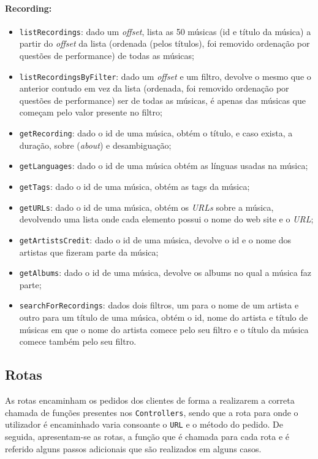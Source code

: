 \documentclass{article}
\begin{document}
\paragraph{\textbf{Recording:}}
    \begin{itemize}
        \item \texttt{listRecordings}: dado um \textit{offset}, lista as 50 músicas (id e título da música) a partir do \textit{offset} da lista (ordenada (pelos títulos), foi removido ordenação por questões de performance) de todas as músicas;
        \item \texttt{listRecordingsByFilter}: dado um \textit{offset} e um filtro, devolve o mesmo que o anterior contudo em vez da lista (ordenada, foi removido ordenação por questões de performance) ser de todas as músicas, é apenas das músicas que começam pelo valor presente no filtro;
        \item \texttt{getRecording}: dado o id de uma música, obtém o título, e caso exista, a duração, sobre (\textit{about}) e desambiguação;
        \item \texttt{getLanguages}: dado o id de uma música obtém as línguas usadas na música;
        \item \texttt{getTags}: dado o id de uma música, obtém as tags da música;
        \item \texttt{getURLs}: dado o id de uma música, obtém os \textit{URLs} sobre a música, devolvendo uma lista onde cada elemento possui o nome do web site e o \textit{URL};
        \item \texttt{getArtistsCredit}: dado o id de uma música, devolve o id e o nome dos artistas que fizeram parte da música;
        \item \texttt{getAlbums}: dado o id de uma música, devolve os albums no qual a música faz parte;
        \item \texttt{searchForRecordings}: dados dois filtros, um para o nome de um artista e outro para um título de uma música, obtém o id, nome do artista e título de músicas em que o nome do artista comece pelo seu filtro e o título da música comece também pelo seu filtro.
    \end{itemize}

\subsection{Rotas}

As rotas encaminham os pedidos dos clientes de forma a realizarem a correta chamada de funções presentes nos \texttt{Controllers}, sendo que a rota para onde o utilizador é encaminhado varia consoante o \texttt{URL} e o método do pedido.
De seguida, apresentam-se as rotas, a função que é chamada para cada rota e é referido alguns passos adicionais que são realizados em alguns casos.
\end{document}
